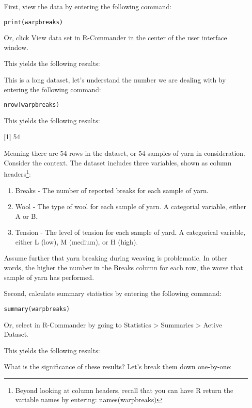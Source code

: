 First, view the data by entering the following command:

\texttt{print(warpbreaks)}

Or, click View data set in R-Commander in the center of the user interface window.

This yields the following results:


This is a long dataset, let's understand the number we are dealing with by entering the following command:

\texttt{nrow(warpbreaks)}

This yields the following results:

[1] 54

Meaning there are 54 rows in the dataset, or 54 samples of yarn in consideration. Consider the context. The dataset includes three variables, shown as column headers\footnote{Beyond looking at column headers, recall that you can have R return the variable names by entering: names(warpbreaks)}:

\begin{enumerate}
 \item Breaks - The number of reported breaks for each sample of yarn.
 \item Wool - The type of wool for each sample of yarn. A categorial variable, either A or B.
 \item Tension - The level of tension for each sample of yard. A categorical variable, either L (low), M (medium), or H (high).
\end{enumerate}

Assume further that yarn breaking during weaving is problematic. In other words, the higher the number in the Breaks column for each row, the worse that sample of yarn has performed. 

Second, calculate summary statistics by entering the following command:

\texttt{summary(warpbreaks)}

Or, select in R-Commander by going to Statistics > Summaries > Active Dataset.

This yields the following results:


What is the significance of these results? Let's break them down one-by-one:

